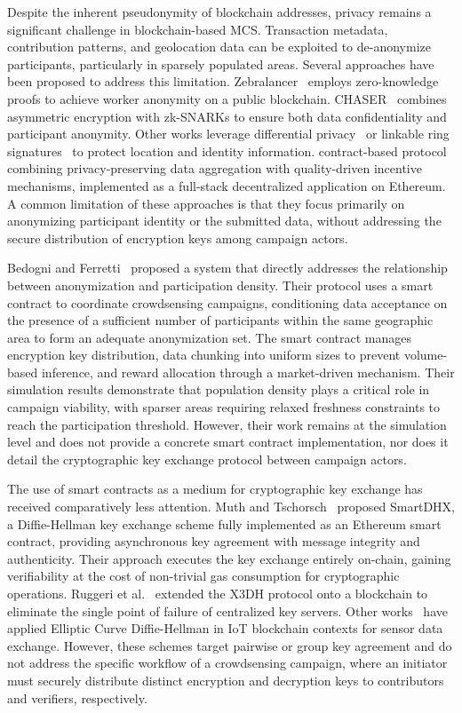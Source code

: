 Despite the inherent pseudonymity of blockchain addresses, privacy remains a
significant challenge in blockchain-based MCS. Transaction metadata,
contribution patterns, and geolocation data can be exploited to
de-anonymize participants, particularly in sparsely populated areas.
Several approaches have been proposed to address this limitation.
Zebralancer~\cite{lu2018zebralancer} employs zero-knowledge proofs to
achieve worker anonymity on a public blockchain.
CHASER~\cite{ying2025chaser} combines asymmetric encryption with
zk-SNARKs to ensure both data confidentiality and participant anonymity.
Other works leverage differential privacy~\cite{kim2022privacy}
or linkable ring signatures~\cite{zou2019crowdblps} to protect location and identity information.
contract-based protocol combining privacy-preserving data aggregation with
quality-driven incentive mechanisms, implemented as a full-stack decentralized
application on Ethereum.
A common limitation of these approaches is that they focus primarily on anonymizing participant identity or the submitted data,
without addressing the secure distribution of encryption keys among campaign actors.

Bedogni and Ferretti~\cite{bedogni2024crowdsensing} proposed a system
that directly addresses the relationship between anonymization and
participation density.
Their protocol uses a smart contract to coordinate crowdsensing campaigns, conditioning data acceptance on the presence of a
sufficient number of participants within the same geographic area to form an adequate anonymization set.
The smart contract manages encryption key distribution, data chunking into uniform sizes to prevent volume-based
inference, and reward allocation through a market-driven mechanism.
Their simulation results demonstrate that population density plays a critical role
in campaign viability, with sparser areas requiring relaxed freshness
constraints to reach the participation threshold.
However, their work remains at the simulation level and does not provide a concrete smart contract
implementation, nor does it detail the cryptographic key exchange protocol between campaign actors.

The use of smart contracts as a medium for cryptographic key exchange has
received comparatively less attention.
Muth and Tschorsch~\cite{muth2020smartdhx} proposed SmartDHX, a Diffie-Hellman key
exchange scheme fully implemented as an Ethereum smart contract, providing
asynchronous key agreement with message integrity and authenticity.
Their approach executes the key exchange entirely on-chain, gaining verifiability
at the cost of non-trivial gas consumption for cryptographic operations.
Ruggeri et al.~\cite{ruggeri2020bcbx3dh} extended the X3DH protocol
onto a blockchain to eliminate the single point of failure of centralized key servers.
Other works~\cite{owoh2019ecdh} have applied Elliptic Curve
Diffie-Hellman in IoT blockchain contexts for sensor data exchange.
However, these schemes target pairwise or group key agreement and do not address the
specific workflow of a crowdsensing campaign, where an initiator must securely
distribute distinct encryption and decryption keys to contributors and
verifiers, respectively.

